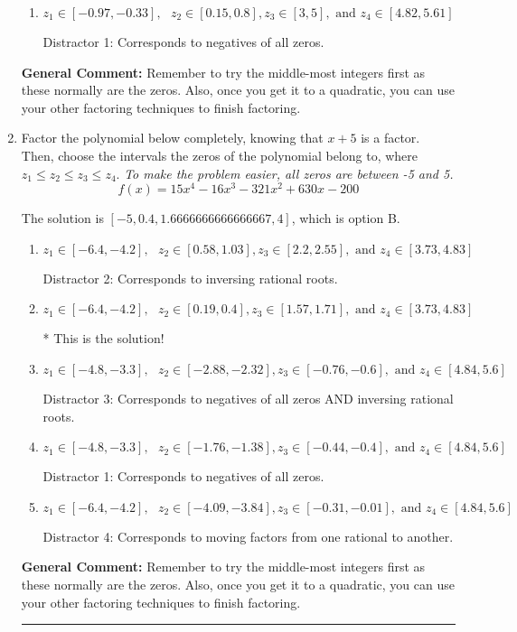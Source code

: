 \documentclass{extbook}[14pt]
\newcommand{\litem}[1]{\item #1

\rule{\textwidth}{0.4pt}}
\begin{document}
\begin{enumerate}
{\begin{enumerate}[label=\Alph*.]
 Distractor 2: Corresponds to inversing rational roots.
\item \( z_1 \in [-0.97, -0.33], \text{   }  z_2 \in [0.15, 0.8], z_3 \in [3, 5], \text{   and   } z_4 \in [4.82, 5.61] \)

 Distractor 1: Corresponds to negatives of all zeros.
\end{enumerate}

\textbf{General Comment:} Remember to try the middle-most integers first as these normally are the zeros. Also, once you get it to a quadratic, you can use your other factoring techniques to finish factoring.
}
\litem{
Factor the polynomial below completely, knowing that $x+5$ is a factor. Then, choose the intervals the zeros of the polynomial belong to, where $z_1 \leq z_2 \leq z_3 \leq z_4$. \textit{To make the problem easier, all zeros are between -5 and 5.}
\[ f(x) = 15x^{4} -16 x^{3} -321 x^{2} +630 x -200 \]

The solution is \( [-5, 0.4, 1.6666666666666667, 4] \), which is option B.\begin{enumerate}[label=\Alph*.]
\item \( z_1 \in [-6.4, -4.2], \text{   }  z_2 \in [0.58, 1.03], z_3 \in [2.2, 2.55], \text{   and   } z_4 \in [3.73, 4.83] \)

 Distractor 2: Corresponds to inversing rational roots.
\item \( z_1 \in [-6.4, -4.2], \text{   }  z_2 \in [0.19, 0.4], z_3 \in [1.57, 1.71], \text{   and   } z_4 \in [3.73, 4.83] \)

* This is the solution!
\item \( z_1 \in [-4.8, -3.3], \text{   }  z_2 \in [-2.88, -2.32], z_3 \in [-0.76, -0.6], \text{   and   } z_4 \in [4.84, 5.6] \)

 Distractor 3: Corresponds to negatives of all zeros AND inversing rational roots.
\item \( z_1 \in [-4.8, -3.3], \text{   }  z_2 \in [-1.76, -1.38], z_3 \in [-0.44, -0.4], \text{   and   } z_4 \in [4.84, 5.6] \)

 Distractor 1: Corresponds to negatives of all zeros.
\item \( z_1 \in [-6.4, -4.2], \text{   }  z_2 \in [-4.09, -3.84], z_3 \in [-0.31, -0.01], \text{   and   } z_4 \in [4.84, 5.6] \)

 Distractor 4: Corresponds to moving factors from one rational to another.
\end{enumerate}

\textbf{General Comment:} Remember to try the middle-most integers first as these normally are the zeros. Also, once you get it to a quadratic, you can use your other factoring techniques to finish factoring.
}
\end{enumerate}
\end{document}
